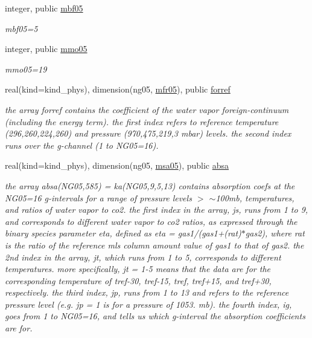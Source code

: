 \begin{DoxyCompactItemize}
integer, public \hyperlink{group__module__radlw__kgbnn_ga57db9a9cb9acac604df555038f6127a3}{mbf05}
\begin{DoxyCompactList}\small\item\em mbf05=5 \end{DoxyCompactList}\item 
integer, public \hyperlink{group__module__radlw__kgbnn_gaa552aae4878030144218ca6c2bbe417f}{mmo05}
\begin{DoxyCompactList}\small\item\em mmo05=19 \end{DoxyCompactList}\item 
real(kind=kind\+\_\+phys), dimension(ng05, \hyperlink{group__module__radlw__kgbnn_ga44f07da9a7f99377f7d331249c475b80}{mfr05}), public \hyperlink{group__module__radlw__kgbnn_ga6ff0c311db14b41c9bdf1170164adc3a}{forref}
\begin{DoxyCompactList}\small\item\em the array forref contains the coefficient of the water vapor foreign-\/continuum (including the energy term). the first index refers to reference temperature (296,260,224,260) and pressure (970,475,219,3 mbar) levels. the second index runs over the g-\/channel (1 to N\+G05=16). \end{DoxyCompactList}\item 
real(kind=kind\+\_\+phys), dimension(ng05, \hyperlink{namespacemodule__radlw__kgb05_a79c5177c6d0e56a69f4d1a0704879539}{msa05}), public \hyperlink{group__module__radlw__kgbnn_ga30ce809b40dd99b3219996ac8f023274}{absa}
\begin{DoxyCompactList}\small\item\em the array absa(\+N\+G05,585) = ka(\+N\+G05,9,5,13) contains absorption coefs at the N\+G05=16 g-\/intervals for a range of pressure levels $>$ $\sim$100mb, temperatures, and ratios of water vapor to co2. the first index in the array, js, runs from 1 to 9, and corresponds to different water vapor to co2 ratios, as expressed through the binary species parameter eta, defined as eta = gas1/(gas1+(rat)$\ast$gas2), where rat is the ratio of the reference mls column amount value of gas1 to that of gas2. the 2nd index in the array, jt, which runs from 1 to 5, corresponds to different temperatures. more specifically, jt = 1-\/5 means that the data are for the corresponding temperature of tref-\/30, tref-\/15, tref, tref+15, and tref+30, respectively. the third index, jp, runs from 1 to 13 and refers to the reference pressure level (e.\+g. jp = 1 is for a pressure of 1053. mb). the fourth index, ig, goes from 1 to N\+G05=16, and tells us which g-\/interval the absorption coefficients are for. \end{DoxyCompactList}\item 

\end{DoxyCompactItemize}
